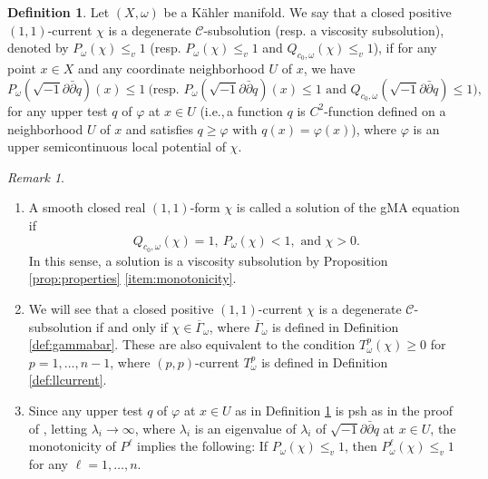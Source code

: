 \documentclass{amsart}
\numberwithin{equation}{section}
\theoremstyle{plain}
\theoremstyle{definition}
\newtheorem{defn}[equation]{Definition}
\theoremstyle{remark}
\newtheorem{remark}[equation]{Remark}
\newcommand{\delb}{\sqrt{-1}\partial\bar{\partial}}
\begin{document}
\begin{defn}\label{defn:vsub}
    Let $(X,\omega)$ be a K{\"a}hler manifold. 
    We say that a closed positive $(1,1)$-current $\chi$ is a degenerate $\mathcal{C}$-subsolution (resp. a viscosity subsolution), denoted by $P_\omega(\chi)\le_v1$ (resp. $P_\omega(\chi)\le_v1$ and $Q_{c_0,\omega}(\chi)\le_v1$), if for any point $x\in X$ and any coordinate neighborhood $U$ of $x$, we have  
    $$P_\omega(\delb q)(x)\le 1\ \bigg( \text{resp. } P_\omega(\delb q)(x)\le 1 \text{ and } Q_{c_0,\omega}(\delb q)\le1\bigg),$$
    for any upper test $q$ of $\varphi$ at $x \in U$ (i.e.,\,a function $q$ is $C^2$-function defined on a neighborhood $U$ of $x$ and satisfies $q\ge\varphi$ with $q(x)=\varphi(x)$),
    where $\varphi$ is an upper semicontinuous local potential of $\chi$.
\end{defn}

\begin{remark}\label{rem:visc}
    \begin{enumerate}[label={\upshape(\roman*)}]
        \item A smooth closed real $(1,1)$-form $\chi$ is called a solution of the gMA equation if
        \begin{equation*}
            Q_{c_0,\omega}(\chi)=1,\ P_\omega(\chi)<1, \text{ and } \chi>0.
        \end{equation*}
        In this sense,  a solution is a viscosity subsolution by Proposition \ref{prop:properties} \ref{item:monotonicity}.
        \item We will see that a closed positive $(1,1)$-current $\chi$ is a degenerate $\mathcal{C}$-subsolution if and only if $\chi\in\overline{\Gamma}_\omega$, where $\overline{\Gamma}_\omega$ is defined in Definition \ref{def:gammabar}. These are also equivalent to the condition $T^p_\omega(\chi)\ge0$ for $p=1,\dots,n-1$, where $(p,p)$-current $T^p_\omega$ is defined in Definition \ref{def:llcurrent}. 
        \item\label{item:monovisc} Since any upper test $q$ of $\varphi$ at $x\in U$ as in Definition \ref{defn:vsub} is psh as in the proof of \cite[Proposition 1.3]{EGZ}, letting $\lambda_i\to\infty$, where $\lambda_i$ is an eigenvalue of $\lambda_i$ of $\delb q$ at $x\in U$, the monotonicity of $P^\ell$ implies the following: If $P_\omega(\chi)\le_v1$, then $P^\ell_\omega(\chi)\le_v1$ for any $\ell=1,\dots,n$.
    \end{enumerate}
\end{remark}
\end{document}

